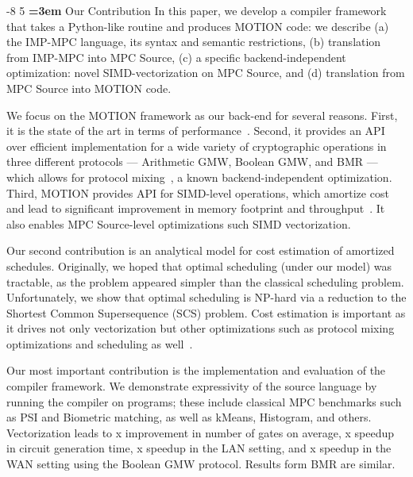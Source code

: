 \documentclass[sigconf, screen, natbib=false, dvipsnames, table]{acmart}
\makeatletter
\renewcommand{\subsection}{\@startsection{subsection}{2}{\z@}%
                        {-8\p@ \@plus -4\p@ \@minus -4\p@}%
                        {5\p@ \@plus 2\p@ \@minus 2\p@}%
                        {\normalfont\Large\bfseries\boldmath
                         \rightskip=\z@ \@plus 3em\pretolerance=10000 }}
\theoremstyle{definition}
\makeatother
\begin{document}
\subsection{Our Contribution} In this paper, we develop a compiler framework that takes a Python-like routine and produces MOTION code: we describe (a) the IMP-MPC language, its syntax and semantic restrictions, (b) translation from IMP-MPC into MPC Source, (c) a specific backend-independent optimization: novel SIMD-vectorization on MPC Source, and (d) translation from MPC Source into MOTION code. %

We focus on the MOTION framework as our back-end for several reasons. First, it is the state of the art in terms of performance~\cite{Braun:2022}. Second, it provides an API over efficient implementation for a wide variety of cryptographic operations in three different protocols ---  Arithmetic GMW, Boolean GMW, and BMR --- which allows for protocol mixing~\cite{Ishaq:2019, Fang:2022}, a known backend-independent optimization. Third, MOTION provides API for SIMD-level operations, which amortize cost and lead to significant improvement in memory footprint and 
throughput~\cite{NDSS:DemSchZoh15, CCS:ABFKLO18, Braun:2022}. It also enables MPC Source-level optimizations such SIMD vectorization. 

Our second contribution is an analytical model for cost estimation of amortized schedules. Originally, we hoped that optimal scheduling (under our model) was tractable, as the problem
appeared simpler than the classical scheduling problem. Unfortunately, we show that optimal scheduling is NP-hard via a reduction to the Shortest Common Supersequence (SCS) problem. 
Cost estimation is important as it drives not only vectorization but other optimizations such as protocol mixing optimizations and scheduling as well~\cite{Ishaq:2019, Fang:2022}. 

Our most important contribution is the implementation and evaluation of the compiler framework. We demonstrate expressivity of the source language by running the compiler on  programs; these include classical MPC benchmarks such as PSI and Biometric matching, as well as kMeans, Histogram, and others. Vectorization leads to x improvement in number of gates on average, x speedup in circuit generation time, x speedup in the LAN setting, and x speedup in the WAN setting using the Boolean GMW protocol. Results form BMR are similar. 
\end{document}
